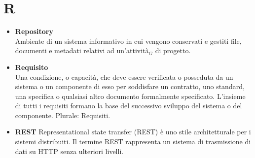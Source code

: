 \chapter{R} \label{R}
	\begin{itemize}
		\item \textbf{Repository} \\
		Ambiente di un sistema informativo in cui vengono conservati e gestiti file, documenti e metadati relativi ad un’attività$_G$ di progetto.
		
		\item \textbf{Requisito}\\
		Una condizione, o capacità, che deve essere verificata o posseduta da un sistema o un componente di esso per soddisfare un contratto, uno standard, una specifica o qualsiasi altro documento formalmente specificato. L'insieme di tutti i requisiti formano la base del successivo sviluppo del sistema o del componente.
		Plurale: Requisiti.
		
		\item \textbf{REST}
		Representational state transfer (REST) è uno stile architetturale per i sistemi distribuiti. Il termine REST rappresenta un sistema di trasmissione di dati su HTTP senza ulteriori livelli.
	\end{itemize}